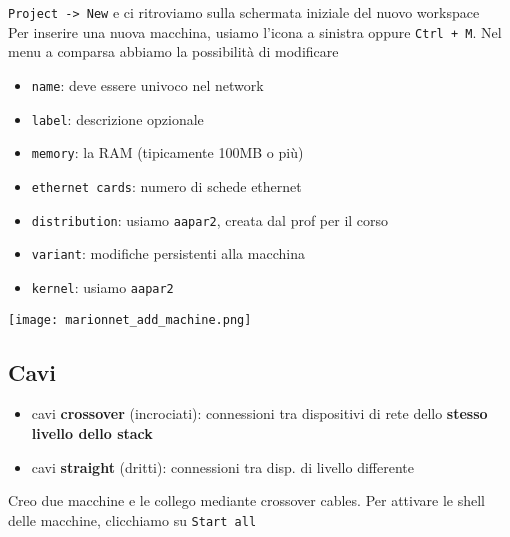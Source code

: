 \lstinline|Project -> New| e ci ritroviamo sulla schermata iniziale del nuovo workspace\\
Per inserire una nuova macchina, usiamo l'icona a sinistra oppure \lstinline|Ctrl + M|. Nel menu a comparsa abbiamo la possibilit\`a di modificare

\noindent
\begin{minipage}[c]{.5\textwidth}
\begin{itemize}
  \item \lstinline|name|: deve essere univoco nel network
  \item \lstinline|label|: descrizione opzionale
  \item \lstinline|memory|: la RAM (tipicamente 100MB o pi\`u)
  \item \lstinline|ethernet cards|: numero di schede ethernet
  \item \lstinline|distribution|: usiamo \lstinline|aapar2|, creata dal prof per il corso
  \item \lstinline|variant|: modifiche persistenti alla macchina
  \item \lstinline|kernel|: usiamo \lstinline|aapar2|
\end{itemize}
\end{minipage}
\hfill
\begin{minipage}[c]{.2\textwidth}
\texttt{[image: marionnet\_add\_machine.png]}
\end{minipage}


\subsection*{Cavi}

\begin{itemize}
  \item cavi \textbf{crossover} (incrociati): connessioni tra dispositivi di rete dello \textbf{stesso livello dello stack}
  \item cavi \textbf{straight} (dritti): connessioni tra disp. di livello differente
\end{itemize}

\begin{example}[frametitle={Esempio base: collegare due macchine tra loro}]
  Creo due macchine e le collego mediante crossover cables. Per attivare le shell delle macchine, clicchiamo su \lstinline|Start all|
\end{example}




